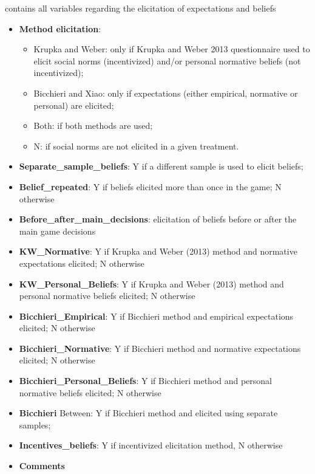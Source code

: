 \documentclass[
]{article}
\providecommand{\tightlist}{%
  \setlength{\itemsep}{0pt}\setlength{\parskip}{0pt}}
\begin{document}
contains all variables regarding the elicitation of expectations and
beliefs

\begin{itemize}
\tightlist
\item
  \textbf{Method elicitation}:

  \begin{itemize}
  \tightlist
  \item
    Krupka and Weber: only if Krupka and Weber 2013 questionnaire used
    to elicit social norms (incentivized) and/or personal normative
    beliefs (not incentivized);
  \item
    Bicchieri and Xiao: only if expectations (either empirical,
    normative or personal) are elicited;
  \item
    Both: if both methods are used;
  \item
    N: if social norms are not elicited in a given treatment.
  \end{itemize}
\item
  \textbf{Separate\_sample\_beliefs}: Y if a different sample is used to
  elicit beliefs;
\item
  \textbf{Belief\_repeated}: Y if beliefs elicited more than once in the
  game; N otherwise
\item
  \textbf{Before\_after\_main\_decisions}: elicitation of beliefs before
  or after the main game decisions
\item
  \textbf{KW\_Normative}: Y if Krupka and Weber (2013) method and
  normative expectations elicited; N otherwise
\item
  \textbf{KW\_Personal\_Beliefs}: Y if Krupka and Weber (2013) method
  and personal normative beliefs elicited; N otherwise
\item
  \textbf{Bicchieri\_Empirical}: Y if Bicchieri method and empirical
  expectations elicited; N otherwise
\item
  \textbf{Bicchieri\_Normative}: Y if Bicchieri method and normative
  expectations elicited; N otherwise
\item
  \textbf{Bicchieri\_Personal\_Beliefs}: Y if Bicchieri method and
  personal normative beliefs elicited; N otherwise
\item
  \textbf{Bicchieri} Between: Y if Bicchieri method and elicited using
  separate samples;
\item
  \textbf{Incentives\_beliefs}: Y if incentivized elicitation method, N
  otherwise
\item
  \textbf{Comments}
\end{itemize}
\end{document}
